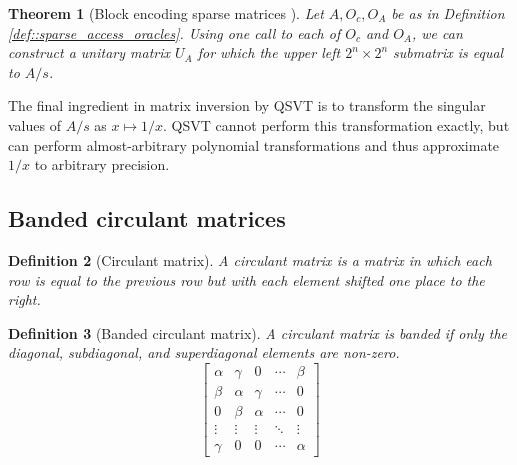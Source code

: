 \documentclass[10pt, twocolumn]{article}
\newtheorem{theorem}{Theorem}[section]
\newtheorem{definition}[theorem]{Definition}
\begin{document}
\begin{theorem}[Block encoding sparse matrices \cite{gilyen2019quantum}]
	Let $A, O_c, O_A$ be as in Definition \ref{def::sparse_access_oracles}. Using one call to each of $O_c$ and $O_A$, we can construct a unitary matrix $U_A$ for which the upper left $2^n \times 2^n$ submatrix is equal to $A/s$.
\end{theorem}

The final ingredient in matrix inversion by QSVT is to transform the singular values of $A/s$ as $x \mapsto 1/x$. QSVT cannot perform this transformation exactly, but can perform almost-arbitrary polynomial transformations \cite{sunderhauf2023generalized} and thus approximate $1/x$ to arbitrary precision.

\subsection{Banded circulant matrices}

\begin{definition}[Circulant matrix]
	A circulant matrix is a matrix in which each row is equal to the previous row but with each element shifted one place to the right.
\end{definition}

\begin{definition}[Banded circulant matrix]
	A circulant matrix is banded if only the diagonal, subdiagonal, and superdiagonal elements are non-zero.
	\[
		\begin{bmatrix}
			\alpha & \gamma & 0 & \cdots & \beta \\
			\beta & \alpha & \gamma & \cdots & 0 \\
			0 & \beta & \alpha & \cdots & 0 \\
			\vdots & \vdots & \vdots & \ddots & \vdots \\
			\gamma & 0 & 0 & \cdots & \alpha
		\end{bmatrix}
	\]
\end{definition}

\newpage

\printbibliography
\end{document}
